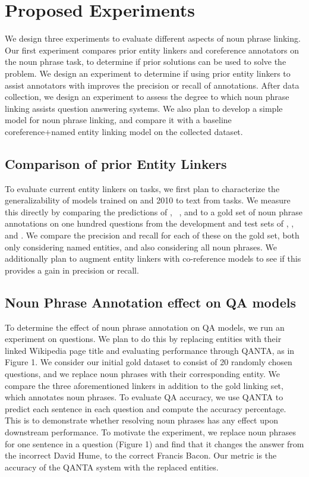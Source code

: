 \section{Proposed Experiments}
\label{sec:exp}

We design three experiments to evaluate different aspects of noun phrase linking. 
Our first experiment compares prior entity linkers and coreference annotators on the noun phrase task, to determine if prior solutions can be used to solve the problem. 
We design an experiment to determine if using prior entity linkers to assist annotators with improves the precision or recall of annotations. 
After data collection, we design an experiment to assess the degree to which noun phrase linking assists question answering systems. 
We also plan to develop a simple model for noun phrase linking, and compare it with a baseline coreference+named entity linking model on the collected dataset. 

\subsection{Comparison of prior Entity Linkers}

To evaluate current entity linkers on \qa{} tasks, we first plan to characterize the generalizability of \nel{} models trained on  and  2010 to text from \qa{} tasks.
We measure this directly by comparing the predictions of , ~\citep{wu2019blink}, and \cite{gupta2017entity} to a gold set of noun phrase annotations on one hundred questions from the development and test sets of \qb{}, \triviaqa{}, and \searchqa{}.
We compare the precision and recall for each of these on the gold set, both only considering named entities, and also considering all noun phrases. 
We additionally plan to augment entity linkers with co-reference models to see if this provides a gain in precision or recall. 

\subsection{Noun Phrase Annotation effect on QA models}
To determine the effect of noun phrase annotation on QA models, we run an experiment on \qb{} questions. 
We plan to do this by replacing entities with their linked Wikipedia page title and evaluating performance through QANTA, as in Figure 1. 
We consider our initial gold dataset to consist of 20 randomly chosen \qb{} questions, and we replace noun phrases with their corresponding entity. 
We compare the three aforementioned linkers in addition to the gold linking set, which annotates noun phrases. 
To evaluate QA accuracy, we use QANTA to predict each sentence in each question and compute the accuracy percentage. 
This is to demonstrate whether resolving noun phrases has any effect upon downstream performance. 
To motivate the experiment, we replace noun phrases for one sentence in a question (Figure 1) and find that it changes the answer from the incorrect David Hume, to the correct Francis Bacon. 
Our metric is the accuracy of the QANTA \qa{} system with the replaced entities. 

